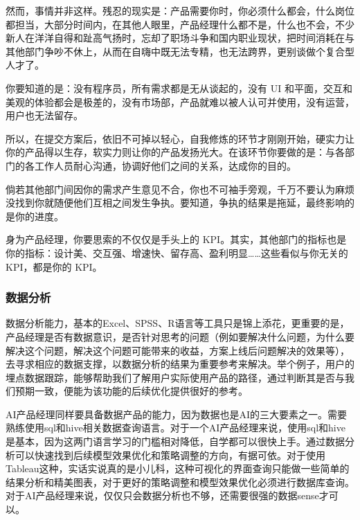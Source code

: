 \documentclass[letterpaper,10pt,english]{sphinxmanual}
\begin{document}
然而，事情并非这样。残忍的现实是：产品需要你时，你必须什么都会，什么岗位都担当，大部分时间内，在其他人眼里，产品经理什么都不是，什么也不会，不少新人在洋洋自得和趾高气扬时，忘却了职场斗争和国内职业现状，把时间消耗在与其他部门争吵不休上，从而在自嗨中既无法专精，也无法跨界，更别谈做个复合型人才了。

你要知道的是：没有程序员，所有需求都是无从谈起的，没有 UI
和平面，交互和美观的体验都会是极差的，没有市场部，产品就难以被人认可并使用，没有运营，用户也无法留存。

所以，在提交方案后，依旧不可掉以轻心，自我修炼的环节才刚刚开始，硬实力让你的产品得以生存，软实力则让你的产品发扬光大。在该环节你要做的是：与各部门的各工作人员耐心沟通，协调好他们之间的关系，达成你的目的。

倘若其他部门间因你的需求产生意见不合，你也不可袖手旁观，千万不要认为麻烦没找到你就随便他们互相之间发生争执。要知道，争执的结果是拖延，最终影响的是你的进度。

身为产品经理，你要思索的不仅仅是手头上的
KPI。其实，其他部门的指标也是你的指标：设计美、交互强、增速快、留存高、盈利明显……这些看似与你无关的
KPI，都是你的 KPI。


\subsubsection{数据分析}
\label{\detokenize{chapter_knowledge/data_analysis:data-analysis}}\label{\detokenize{chapter_knowledge/data_analysis:id1}}\label{\detokenize{chapter_knowledge/data_analysis::doc}}
数据分析能力，基本的Excel、SPSS、R语言等工具只是锦上添花，更重要的是，产品经理是否有数据意识，是否针对思考的问题（例如要解决什么问题，为什么要解决这个问题，解决这个问题可能带来的收益，方案上线后问题解决的效果等），去寻求相应的数据支撑，以数据分析的结果为重要参考来解决。举个例子，用户的埋点数据跟踪，能够帮助我们了解用户实际使用产品的路径，通过判断其是否与我们预期一致，便能为该功能的后续优化提供很好的参考。
%
\begin{footnote}[661]\sphinxAtStartFootnote
{}
%
\end{footnote}

AI产品经理同样要具备数据产品的能力，因为数据也是AI的三大要素之一。需要熟练使用sql和hive相关数据查询语言。对于一个AI产品经理来说，使用sql和hive是基本，因为这两门语言学习的门槛相对降低，自学都可以很快上手。通过数据分析可以快速找到后续模型效果优化和策略调整的方向，有据可依。对于使用Tableau这种，实话实说真的是小儿科，这种可视化的界面查询只能做一些简单的结果分析和精美图表，对于更好的策略调整和模型效果优化必须进行数据库查询。对于AI产品经理来说，仅仅只会数据分析也不够，还需要很强的数据sense才可以。
%
\begin{footnote}[662]\sphinxAtStartFootnote
{}
%
\end{footnote}
\end{document}
